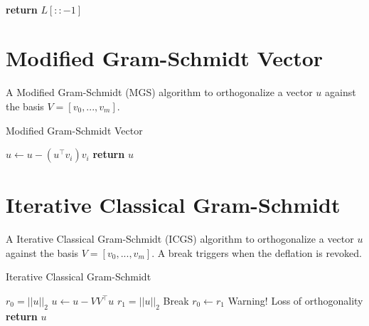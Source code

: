\documentclass[a4paper]{article}
\begin{document}
\begin{algorithm}
\begin{algorithmic}[1]
    \EndWhile
    
\EndFor



\\
\State \textbf{return} $L[::-1]$


\EndProcedure
\end{algorithmic}
\end{algorithm}




























\pagebreak

\section{Modified Gram-Schmidt Vector}
A Modified Gram-Schmidt (MGS) algorithm to orthogonalize a vector $u$ against the basis $V = [v_0,...,v_m] $. 




\begin{algorithm}
\caption{Modified Gram-Schmidt Vector}\label{alg:MGSV}
\begin{algorithmic}[1]

    \State $ u \gets u - (u^\top v_i) v_i$
\EndFor
\State \textbf{return} $ u $
\EndProcedure
\end{algorithmic}
\end{algorithm}

\section{Iterative Classical Gram-Schmidt}
A Iterative Classical Gram-Schmidt (ICGS) algorithm to orthogonalize a vector $u$ against the basis $V = [v_0,...,v_m] $. A break triggers when the deflation is revoked.




\begin{algorithm}
\caption{Iterative Classical Gram-Schmidt}\label{alg:MGSV}
\begin{algorithmic}[1]
\State $r_0 = ||u||_2$
    \State $ u \gets u - VV^\top u$
    \State $ r_1 = ||u||_2$
        \State Break
    \EndIf
    \State $r_0 \gets r_1$
\EndFor
{}
\State Warning! Loss of orthogonality
\EndIf
\State \textbf{return} $ u $
\EndProcedure
\end{algorithmic}
\end{algorithm}
\end{document}
